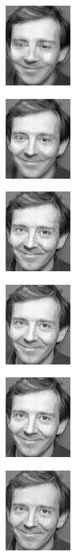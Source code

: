 \documentclass[a4paper]{article}
\begin{document}
\includegraphics[scale=0.500000]{PartialReconstruction5.jpg}

\includegraphics[scale=0.500000]{PartialReconstruction6.jpg}

\includegraphics[scale=0.500000]{PartialReconstruction7.jpg}

\includegraphics[scale=0.500000]{PartialReconstruction8.jpg}

\includegraphics[scale=0.500000]{PartialReconstruction9.jpg}

\includegraphics[scale=0.500000]{PartialReconstruction10.jpg}
\end{document}
